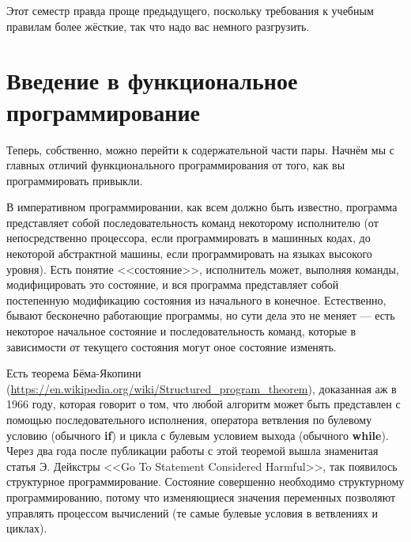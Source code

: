 \documentclass{../../text-style}
\begin{document}
Этот семестр правда проще предыдущего, поскольку требования к учебным правилам более жёсткие, так что надо вас немного разгрузить.

\section{Введение в функциональное программирование}

Теперь, собственно, можно перейти к содержательной части пары. Начнём мы с главных отличий функционального программирования от того, как вы программировать привыкли.

В императивном программировании, как всем должно быть известно, программа представляет собой последовательность команд некоторому исполнителю (от непосредственно процессора, если программировать в машинных кодах, до некоторой абстрактной машины, если программировать на языках высокого уровня). Есть понятие <<состояние>>, исполнитель может, выполняя команды, модифицировать это состояние, и вся программа представляет собой постепенную модификацию состояния из начального в конечное. Естественно, бывают бесконечно работающие программы, но сути дела это не меняет --- есть некоторое начальное состояние и последовательность команд, которые в зависимости от текущего состояния могут оное состояние изменять.

Есть теорема Бёма-Якопини (\url{https://en.wikipedia.org/wiki/Structured_program_theorem}), доказанная аж в 1966 году, которая говорит о том, что любой алгоритм может быть представлен с помощью последовательного исполнения, оператора ветвления по булевому условию (обычного \textbf{if}) и цикла с булевым условием выхода (обычного \textbf{while}). Через два года после публикации работы с этой теоремой вышла знаменитая статья Э. Дейкстры <<Go To Statement Considered Harmful>>, так появилось структурное программирование. Состояние совершенно необходимо структурному программированию, потому что изменяющиеся значения переменных позволяют управлять процессом вычислений (те самые булевые условия в ветвлениях и циклах). 
\end{document}
